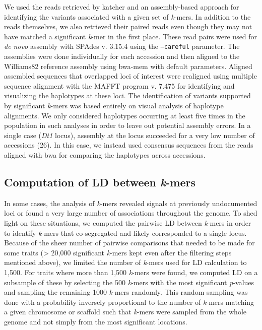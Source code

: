 \documentclass{article}
\begin{document}
We used the reads retrieved by katcher and an assembly-based approach for
identifying the variants associated with a given set of \emph{k}-mers. In
addition to the reads themselves, we also retrieved their paired reads even
though they may not have matched a significant \emph{k}-mer in the first place.
These read pairs were used for \emph{de novo} assembly with SPAdes v. 3.15.4
 using the \texttt{--careful} parameter. The assemblies were done
individually for each accession and then aligned to the Williams82 reference
assembly using bwa-mem with default parameters.  Aligned assembled sequences
that overlapped loci of interest were realigned using multiple sequence
alignment with the MAFFT program v. 7.475  for identifying and
visualizing the haplotypes at these loci. The identification of variants
supported by significant \textit{k}-mers was based entirely on visual analysis
of haplotype alignments. We only considered haplotypes occurring at least five
times in the population in such analyses in order to leave out potential
assembly errors. In a single case (\emph{Dt1} locus), assembly at the locus
succeeded for a very low number of accessions (26). In this case, we instead used
consensus sequences from the reads aligned with bwa for comparing the
haplotypes across accessions. 

\subsection*{Computation of LD between \emph{k}-mers}

In some cases, the analysis of \emph{k}-mers revealed signals at previously
undocumented loci or found a very large number of associations throughout the
genome. To shed light on these situations, we computed the pairwise LD between
\emph{k}-mers in order to identify \emph{k}-mers that co-segregated and
likely corresponded to a single locus. Because of the sheer number of pairwise
comparisons that needed to be made for some traits (> 20,000 significant
\emph{k}-mers kept even after the filtering steps mentioned above), we limited
the number of \emph{k}-mers used for LD calculation to 1,500. For traits where
more than 1,500 \emph{k}-mers were found, we computed LD on a subsample of
these by selecting the 500 \emph{k}-mers with the most significant
\emph{p}-values and sampling the remaining 1000 \emph{k}-mers randomly. This
random sampling was done with a probability inversely proportional to the
number of \emph{k}-mers matching a given chromosome or scaffold such that
\emph{k}-mers were sampled from the whole genome and not simply from the most
significant locations.
\end{document}
